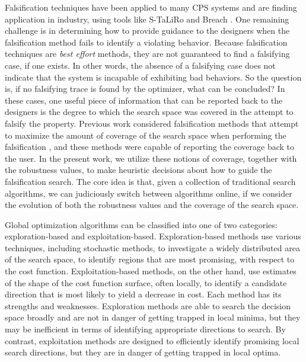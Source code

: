 Falsification techniques have been applied to many CPS systems and are finding application in industry, using tools like S-TaLiRo and Breach \cite{TaliroLFS11,BreachCAV10}.
One remaining challenge is in determining how to provide guidance to the designers when the falsification method fails to identify a violating behavior.
Because falsification techniques are \emph{best effort} methods, they are not guaranteed to find a falsifying case, if one exists.
In other words, the absence of a falsifying case does not indicate that the system is incapable of exhibiting bad behaviors.
So the question is, if no falsifying trace is found by the optimizer, what can be concluded? In these cases, one useful piece of information that can be reported back to the designers is the degree to which the search space was covered in the attempt to falsify the property.
Previous work considered falsification methods that attempt to maximize the amount of coverage of the search space when performing the falsification \cite{Dreossi2015,Adimoolam2017}, and these methods were capable of reporting the coverage back to the user.
In the present work, we utilize these notions of coverage, together with the robustness values, to make heuristic decisions about how to guide the falsification search.
The core idea is that, given a collection of traditional search algorithms, we can judiciously switch between algorithms online, if we consider 
the evolution of both the robustness values and the coverage of the search space.


Global optimization algorithms can be classified into one of two categories: exploration-based and exploitation-based. 
Exploration-based methods use various techniques, including stochastic methods, to investigate a widely distributed area of the search space, to identify regions that are most promising, with respect to the cost function.
Exploitation-based methods, on the other hand, use estimates of the shape of the cost function surface, often locally, to identify a candidate direction that is most likely to yield a decrease in cost.
Each method has its strengths and weaknesses.
Exploration methods are able to search the decision space broadly and are not in danger of getting trapped in local minima, but they may be inefficient in terms of identifying appropriate directions to search.
By contrast, exploitation methods are designed to efficiently identify promising local search directions, but they are in danger of getting trapped in local optima.

